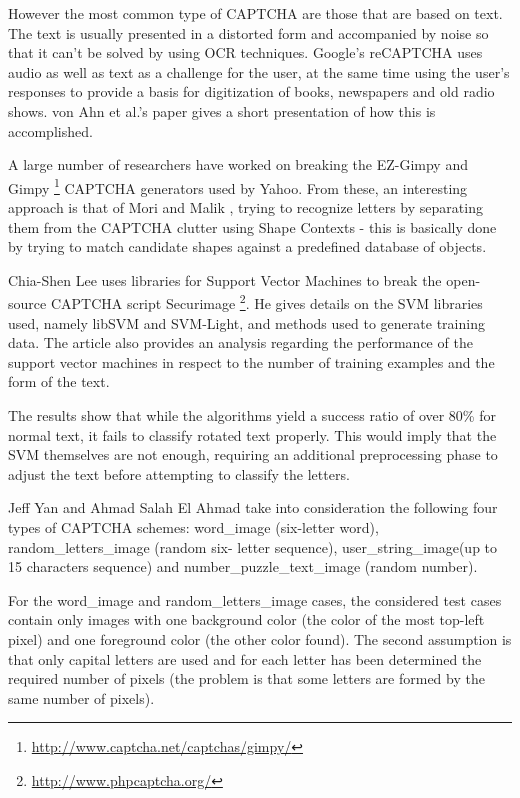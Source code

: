 \documentclass[a4paper,12pt]{article}
\begin{document}
However the most common type of CAPTCHA are those that are based
on text. The text is usually presented in a distorted form
and accompanied by noise so that it can't be solved by using OCR
techniques. Google's reCAPTCHA uses audio as well as text as
a challenge for the user, at the same time using the user's
responses to provide a basis for digitization of books, newspapers
and old radio shows. von Ahn et al.'s paper \cite{vonAhn12092008}
gives a short presentation of how this is accomplished.

A large number of researchers have worked on breaking the EZ-Gimpy
and Gimpy \footnote{\url{http://www.captcha.net/captchas/gimpy/}}
CAPTCHA generators used by Yahoo. From these, an interesting
approach is that of Mori and Malik
\cite{Mori:2003:ROA:1965841.1965858}, trying to recognize letters
by separating them from the CAPTCHA clutter using Shape Contexts
 - this is basically done by trying to match candidate shapes
 against a predefined database of objects.

Chia-Shen Lee \cite{ShenLee} uses libraries for Support Vector
Machines to break the open-source CAPTCHA script Securimage
\footnote{\url{http://www.phpcaptcha.org/}}. He gives details
on the SVM libraries used, namely libSVM and SVM-Light, and
methods used to generate training data. The article also provides
an analysis regarding the performance of the support vector machines
in respect to the number of training examples and the form of
the text.

The results show that while the algorithms yield a success ratio
of over 80\% for normal text, it fails to classify rotated text
properly. This would imply that the SVM themselves are not
enough, requiring an additional preprocessing phase to adjust
the text before attempting to classify the letters.

Jeff Yan and Ahmad Salah El Ahmad \cite{Yan_breakingvisual}
take into consideration the following four types of CAPTCHA schemes:
word\_image (six-letter word), random\_letters\_image (random six-
letter sequence), user\_string\_image(up to 15 characters sequence) and
number\_puzzle\_text\_image (random number).

For the word\_image and random\_letters\_image cases, the considered
test cases contain only images with one background color (the color of
the most top-left pixel) and one foreground color (the other color
found). The second assumption is that only capital letters are used
and for each letter has been determined the required number of pixels
(the problem is that some letters are formed by the same number of
pixels).
\end{document}
